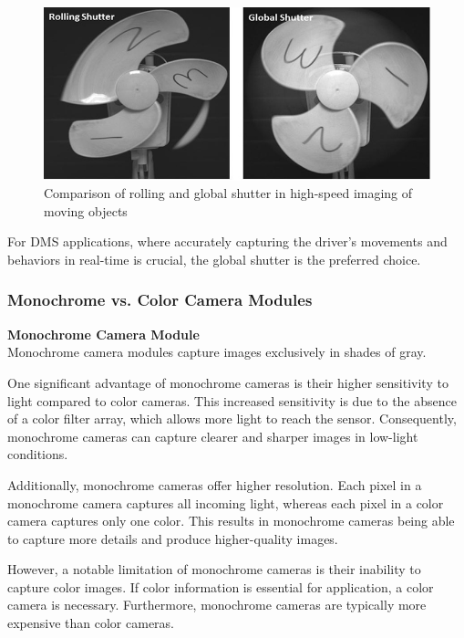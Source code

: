 \begin{figure}[!h]
     \centering
     \includegraphics[scale =0.6]{Images/4.1_Camera_Selection/GlobalVsRolling2.jpg}
     \caption{Comparison of rolling and global shutter in high-speed imaging of moving objects}
     \label{fig:GlobalVsRolling2}
\end{figure}

For DMS applications, where accurately capturing the driver's movements and behaviors in real-time is crucial, the global shutter is the preferred choice.



\subsubsection{\textbf{Monochrome vs. Color Camera Modules}}

\textbf{Monochrome Camera Module} \\
Monochrome camera modules capture images exclusively in shades of gray. 

One significant advantage of monochrome cameras is their higher sensitivity to light compared to color cameras. This increased sensitivity is due to the absence of a color filter array, which allows more light to reach the sensor. Consequently, monochrome cameras can capture clearer and sharper images in low-light conditions.

Additionally, monochrome cameras offer higher resolution. Each pixel in a monochrome camera captures all incoming light, whereas each pixel in a color camera captures only one color. This results in monochrome cameras being able to capture more details and produce higher-quality images.

However, a notable limitation of monochrome cameras is their inability to capture color images. If color information is essential for application, a color camera is necessary. Furthermore, monochrome cameras are typically more expensive than color cameras.


